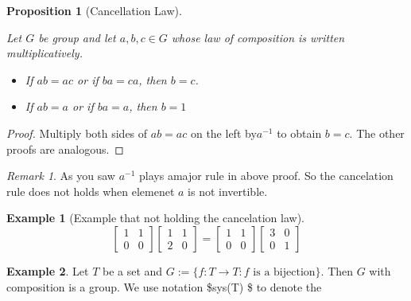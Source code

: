 \documentclass[
]{book}
\providecommand{\tightlist}{%
  \setlength{\itemsep}{0pt}\setlength{\parskip}{0pt}}
\newtheorem{proposition}{Proposition}[chapter]
\theoremstyle{definition}
\theoremstyle{definition}
\newtheorem{example}{Example}[chapter]
\theoremstyle{definition}
\theoremstyle{definition}
\theoremstyle{remark}
\newtheorem*{remark}{Remark}
\begin{document}
\begin{proposition}[Cancellation Law]
\protect\hypertarget{prp:unnamed-chunk-15}{}\label{prp:unnamed-chunk-15}

Let \(G\) be group and let \(a, b, c \in G\) whose law of composition is written multiplicatively.

\begin{itemize}
\tightlist
\item
  If \(ab = ac\) or if \(ba = ca\), then \(b = c\).
\item
  If \(a b = a\) or if \(ba = a\), then \(b = 1\)
\end{itemize}

\end{proposition}

\begin{proof}
Multiply both sides of \(ab=ac\) on the left by\(a^{-1}\) to obtain \(b = c\). The other proofs are analogous.
\end{proof}

\begin{remark}
As you saw \(a^{-1}\) plays amajor rule in above proof. So the cancelation rule does not holds when elemenet \(a\) is not invertible.
\end{remark}

\begin{example}[Example that not holding the cancelation law]
\protect\hypertarget{exm:unnamed-chunk-18}{}\label{exm:unnamed-chunk-18}\[\begin{bmatrix} 1 & 1 \\ 0 & 0\end{bmatrix}
\begin{bmatrix} 1 & 1 \\ 2 & 0\end{bmatrix}=
\begin{bmatrix} 1 & 1 \\ 0 & 0\end{bmatrix}
\begin{bmatrix} 3 & 0 \\ 0 & 1\end{bmatrix}\]
\end{example}

\begin{example}
\protect\hypertarget{exm:unnamed-chunk-19}{}\label{exm:unnamed-chunk-19}Let \(T\) be a set and \(G:=\{f:T\to T: f \text{ is a bijection}\}\). Then \(G\) with composition is a group. We use notation \$sys(T) \$ to denote the
\end{example}
\end{document}
